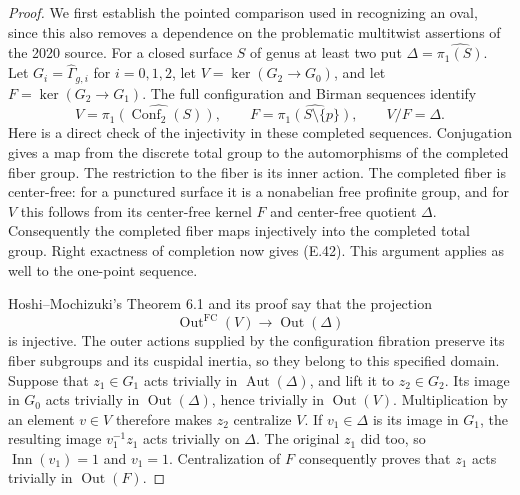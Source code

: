 \begin{proof}
We first establish the pointed comparison used in recognizing
an oval, since this also removes a dependence on the problematic
multitwist assertions of the 2020 source.  For a closed surface
$S$ of genus at least two put $\Delta=\widehat{\pi_1(S)}$.
Let $G_i=\widehat\Gamma_{g,i}$ for $i=0,1,2$, let
$V=\ker(G_2\to G_0)$, and let $F=\ker(G_2\to G_1)$.
The full configuration and Birman sequences identify
\[
 V=\widehat{\pi_1(\operatorname{Conf}_2(S))},\qquad
 F=\widehat{\pi_1(S\setminus\{p\})},\qquad V/F=\Delta.
                                                               \tag{E.42}
\]
Here is a direct check of the injectivity in these completed
sequences.  Conjugation gives a map from the discrete total
group to the automorphisms of the completed fiber group.  The
restriction to the fiber is its inner action.  The completed
fiber is center-free: for a punctured surface it is a nonabelian
free profinite group, and for $V$ this follows from its
center-free kernel $F$ and center-free quotient $\Delta$.
Consequently the completed fiber maps injectively into the
completed total group.  Right exactness of completion now gives
(E.42).  This argument applies as well to the one-point sequence.

Hoshi--Mochizuki's Theorem 6.1 and its proof
\cite{ET_HMNodal2011} say that the projection
\[
 \operatorname{Out}^{\mathrm{FC}}(V)
       \longrightarrow\operatorname{Out}(\Delta)
\]
is injective.  The outer actions supplied by the configuration
fibration preserve its fiber subgroups and its cuspidal inertia,
so they belong to this specified domain.  Suppose that
$z_1\in G_1$ acts trivially in $\operatorname{Aut}(\Delta)$,
and lift it to $z_2\in G_2$.  Its image in $G_0$ acts trivially
in $\operatorname{Out}(\Delta)$, hence trivially in
$\operatorname{Out}(V)$.  Multiplication by an element $v\in V$
therefore makes $z_2$ centralize $V$.  If $v_1\in\Delta$ is
its image in $G_1$, the resulting image $v_1^{-1}z_1$ acts
trivially on $\Delta$.  The original $z_1$ did too, so
$\operatorname{Inn}(v_1)=1$ and $v_1=1$.  Centralization of
$F$ consequently proves that $z_1$ acts trivially in
$\operatorname{Out}(F)$.


\end{proof}
